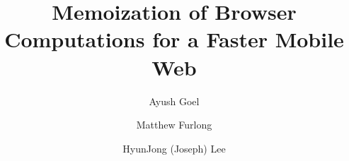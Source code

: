 \documentclass{ns-article-compact}
\begin{document}
\newcommand{\paraspace}{\vspace{0.02in}}
\newcommand{\parab}[1]{\paraspace\noindent{\bf #1} }
\newcommand{\parae}[1]{\paraspace\noindent{\em #1} }
\newcommand{\parabe}[1]{\paraspace\noindent{\bf \em #1} }

\newcommand{\system}{{\sc Pando}\xspace}
\newcommand{\pman}{Placement Manager\xspace}

\def\papertitle{ Memoization of Browser Computations for a Faster Mobile Web}

\title{\papertitle}
\author{
  {\rm Ayush Goel}
  \and
  {\rm Matthew Furlong}
  \and
  {\rm HyunJong (Joseph) Lee}
}
\maketitle

\thispagestyle{empty}








\label{lastpage}

\clearpage



\clearpage
\appendix
\end{document}
